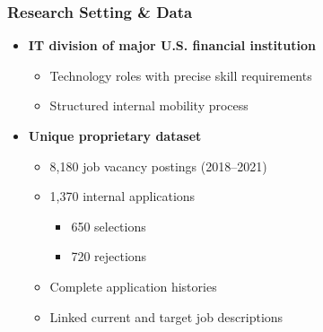\documentclass[11pt,xcolor={dvipsnames},hyperref={pdftex,pdfpagemode=UseNone,hidelinks,pdfdisplaydoctitle=true},usepdftitle=false]{beamer}
\begin{document}
\begin{frame}
\frametitle{Research Setting \& Data}
\begin{itemize}
\item \textbf{IT division of major U.S. financial institution}
  \begin{itemize}
  \item Technology roles with precise skill requirements
  \item Structured internal mobility process
  \end{itemize}

\item \textbf{Unique proprietary dataset}
  \begin{itemize}
  \item 8,180 job vacancy postings (2018–2021)
  \item 1,370 internal applications
    \begin{itemize}
    \item 650 selections
    \item 720 rejections
    \end{itemize}
  \item Complete application histories
  \item Linked current and target job descriptions
  \end{itemize}
\end{itemize}
\end{frame}
\end{document}
